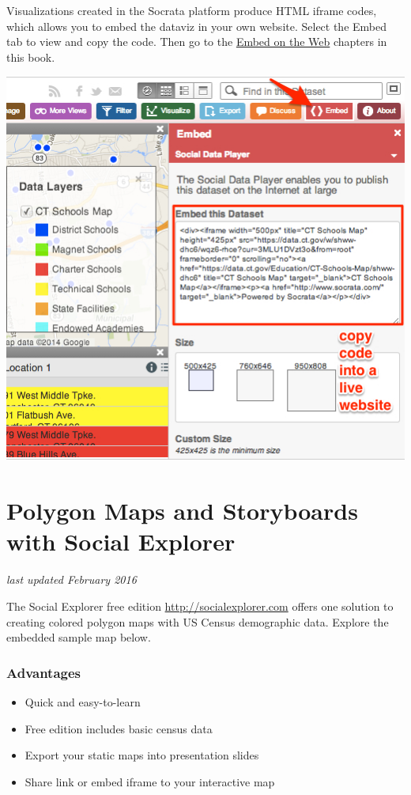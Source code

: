 \documentclass[
  english,
]{book}
\providecommand{\tightlist}{%
  \setlength{\itemsep}{0pt}\setlength{\parskip}{0pt}}
\begin{document}
Visualizations created in the Socrata platform produce HTML iframe codes, which allows you to embed the dataviz in your own website. Select the Embed tab to view and copy the code. Then go to the \href{embed.html}{Embed on the Web} chapters in this book.

\includegraphics{images/06-map/SocrataMap13.jpg}

\hypertarget{social-explorer-maps}{%
\section{Polygon Maps and Storyboards with Social Explorer}\label{social-explorer-maps}}

\emph{last updated February 2016}

The Social Explorer free edition \url{http://socialexplorer.com} offers one solution to creating colored polygon maps with US Census demographic data. Explore the embedded sample map below.

\hypertarget{advantages}{%
\subsubsection*{Advantages}\label{advantages}}

\begin{itemize}
\tightlist
\item
  Quick and easy-to-learn
\item
  Free edition includes basic census data
\item
  Export your static maps into presentation slides
\item
  Share link or embed iframe to your interactive map
\end{itemize}
\end{document}
